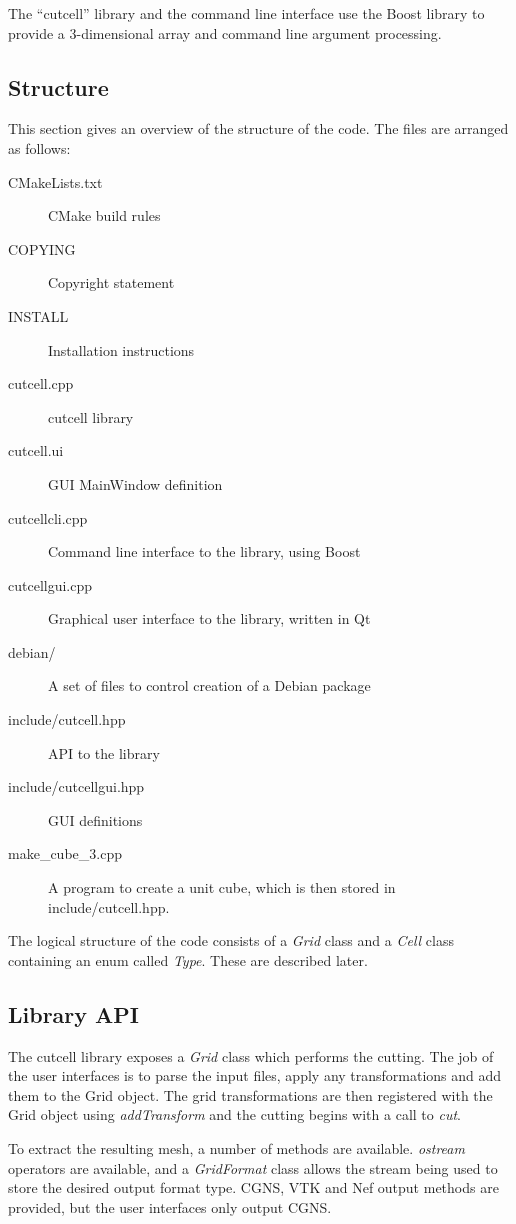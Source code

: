 \documentclass[a4paper,10pt]{article}
\begin{document}
The ``cutcell'' library and the command line interface use the Boost
\cite{boost} library to provide a 3-dimensional array and command line argument
processing.

\subsection{Structure}

This section gives an overview of the structure of the code. The files are
arranged as follows:

\begin{description}
 \item[CMakeLists.txt] CMake build rules
 \item[COPYING] Copyright statement
 \item[INSTALL] Installation instructions
 \item[cutcell.cpp] cutcell library
 \item[cutcell.ui] GUI MainWindow definition
 \item[cutcellcli.cpp] Command line interface to the library, using Boost
 \item[cutcellgui.cpp] Graphical user interface to the library, written in Qt
 \item[debian/] A set of files to control creation of a Debian package
 \item[include/cutcell.hpp] API to the library
 \item[include/cutcellgui.hpp] GUI definitions
 \item[make\_cube\_3.cpp] A program to create a unit cube, which is then stored
in include/cutcell.hpp.
\end{description}

The logical structure of the code consists of a \textit{Grid} class and a
\textit{Cell} class containing an enum called \textit{Type}. These are
described later.

\subsection{Library API}

The cutcell library exposes a \textit{Grid} class which performs the cutting.
The job of the user interfaces is to parse the input files, apply any
transformations and add them to the Grid object. The grid transformations are
then registered with the Grid object using \textit{addTransform} and the
cutting begins with a call to \textit{cut}.

To extract the resulting mesh, a number of methods are available.
\textit{ostream} operators are available, and a \textit{GridFormat} class
allows the stream being used to store the desired output format type. CGNS, VTK
and Nef output methods are provided, but the user interfaces only output CGNS.
\end{document}
